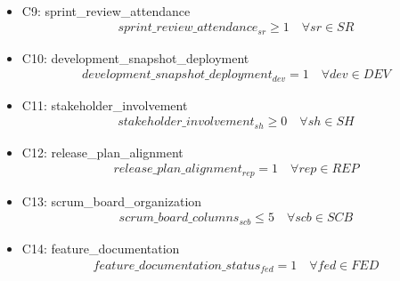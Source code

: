 \documentclass{article}
\begin{document}
\begin{itemize}
\begin{align*}
        \end{align*}
    \item C9: sprint\_review\_attendance
        \begin{align*}
            sprint\_review\_attendance_{sr} \geq 1 \quad \forall sr \in SR
        \end{align*}
    \item C10: development\_snapshot\_deployment
        \begin{align*}
            development\_snapshot\_deployment_{dev} = 1 \quad \forall dev \in DEV
        \end{align*}
    \item C11: stakeholder\_involvement
        \begin{align*}
            stakeholder\_involvement_{sh} \geq 0 \quad \forall sh \in SH
        \end{align*}
    \item C12: release\_plan\_alignment
        \begin{align*}
            release\_plan\_alignment_{rep} = 1 \quad \forall rep \in REP
        \end{align*}
    \item C13: scrum\_board\_organization
        \begin{align*}
            scrum\_board\_columns_{scb} \leq 5 \quad \forall scb \in SCB
        \end{align*}
    \item C14: feature\_documentation
        \begin{align*}
            feature\_documentation\_status_{fed} = 1 \quad \forall fed \in FED
        \end{align*}
\end{itemize}
\end{document}

